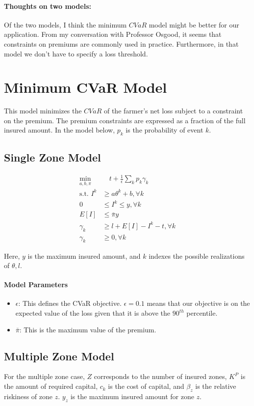 \documentclass[11pt]{article}
\begin{document}
\paragraph*{Thoughts on two models:} Of the two models, I think the minimum $CVaR$ model might be better for our application. From my conversation with Professor Osgood, it seems that constraints on premiums are commonly used in practice. Furthermore, in that model we don't have to specify a loss threshold. 

\section{Minimum CVaR Model}
This model minimizes the $CVaR$ of the farmer's net loss subject to a constraint on the premium. The premium constraints are expressed as a fraction of the full insured amount. In the model below, $p_k$ is the probability of event $k$. 
\subsection*{Single Zone Model}
\begin{align}
    \min_{a,b,\pi} &\quad t + \frac{1}{\epsilon}\sum_k p_k \gamma_k\\
    \text{s.t.   } I^k &\geq a\theta^k + b, \forall k\\
    0 &\leq I^k \leq y, \forall k\\
    E[I] &\leq \bar{\pi}y\\
    \gamma_k &\geq l + E[I] -I^k -t, \forall k\\
    \gamma_k &\geq 0, \forall k
\end{align}

Here, $y$ is the maximum insured amount, and $k$ indexes the possible realizations of $\theta, l$. 

\paragraph*{Model Parameters}
\begin{itemize}
    \item $\epsilon$: This defines the CVaR objective. $\epsilon = 0.1$ means that our objective is on the expected value of the loss given that it is above the $90^{th}$ percentile. 
    \item $\bar{\pi}$: This is the maximum value of the premium. 
\end{itemize}

\subsection*{Multiple Zone Model}
For the multiple zone case, $Z$ corresponds to the number of insured zones, $K^P$ is the amount of required capital, $c_k$ is the cost of capital, and $\beta_z$ is the relative riskiness of zone $z$. $y_z$ is the maximum insured amount for zone $z$. 
\end{document}
